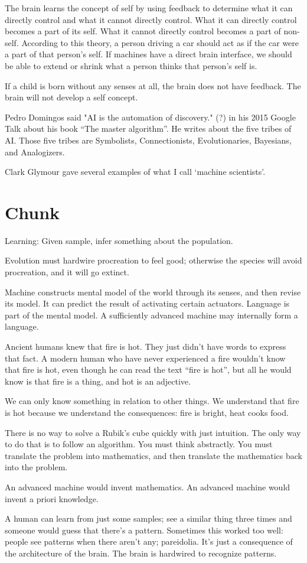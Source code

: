 The brain learns the concept of self by using feedback
to determine what it can directly control
and what it cannot directly control.
What it can directly control becomes a part of its self.
What it cannot directly control becomes a part of non-self.
According to this theory, a person driving a car
should act as if the car were a part of that person's self.
If machines have a direct brain interface,
we should be able to extend or shrink what a person thinks that person's self is.

If a child is born without any senses at all,
the brain does not have feedback.
The brain will not develop a self concept.

Pedro Domingos said
"AI is the automation of discovery." (?)
in his 2015 Google Talk about his book ``The master algorithm''.
He writes about the five tribes of AI.
Those five tribes are Symbolists, Connectionists, Evolutionaries, Bayesians, and Analogizers.

Clark Glymour gave several examples of what I call `machine scientists'.
\cite{GlyAutoDisc}

\section{Chunk}

Learning:
Given sample, infer something about the population.

Evolution must hardwire procreation to feel good;
otherwise the species will avoid procreation,
and it will go extinct.

Machine constructs mental model of the world through its senses,
and then revise its model.
It can predict the result of activating certain actuators.
Language is part of the mental model.
A sufficiently advanced machine may internally form a language.

Ancient humans knew that fire is hot.
They just didn't have words to express that fact.
A modern human who have never experienced a fire
wouldn't know that fire is hot,
even though he can read the text ``fire is hot'',
but all he would know is that fire is a thing, and hot is an adjective.

We can only know something in relation to other things.
We understand that fire is hot because we understand the consequences:
fire is bright, heat cooks food.

There is no way to solve a Rubik's cube quickly with just intuition.
The only way to do that is to follow an algorithm.
You must think abstractly.
You must translate the problem into mathematics,
and then translate the mathematics back into the problem.

An advanced machine would invent mathematics.
An advanced machine would invent a priori knowledge.

A human can learn from just some samples;
see a similar thing three times and someone would guess that there's a pattern.
Sometimes this worked too well: people see patterns when there aren't any;
pareidolia.
It's just a consequence of the architecture of the brain.
The brain is hardwired to recognize patterns.
